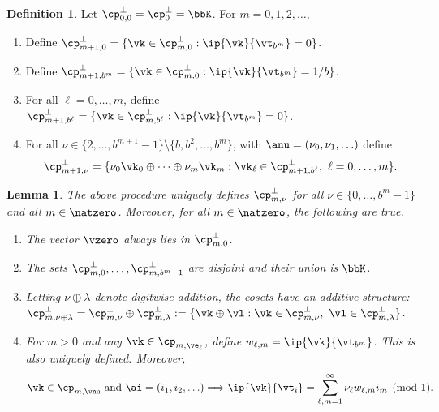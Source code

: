 \documentclass[]{elsarticle}
\newtheorem{lem}{Lemma}
\theoremstyle{definition}
\newtheorem{defin}{Definition}
\begin{document}
\begin{defin} \label{noodefalgo} Let $\cp_{0,0}^{\perp}=\cp_{0}^{\perp}=\bbK$.  For $m=0, 1, 2, \ldots$, 
\begin{enumerate}
\renewcommand{\labelenumi}{\alph{enumi})}
\item Define $\cp_{m+1,0}^{\perp}=\{\vk \in \cp_{m,0}^{\perp} : \ip{\vk}{\vt_{b^{m}}}=0\}$.
\item Define $\cp_{m+1,b^{m}}^{\perp}=\{\vk \in \cp_{m,0}^{\perp} : \ip{\vk}{\vt_{b^{m}}}=1/b\}$.  
\item For all $\ell=0, \ldots, m$, define $\cp_{m+1,b^{\ell}}^{\perp}=\{\vk \in \cp_{m,b^{\ell}}^{\perp} : \ip{\vk}{\vt_{b^{m}}}=0\}$.
\item For all $\nu \in \{2, \ldots, b^{m+1}-1\} \setminus \{b, b^2, \ldots, b^m\}$, with $\anu=(\nu_0, \nu_1, \ldots)$ define 
\[
\cp_{m+1,\nu}^{\perp}= \{\nu_0\vk_0 \oplus \cdots \oplus \nu_{m} \vk_{m}  : \vk_\ell \in \cp_{m+1,b^{\ell}}^{\perp},\  \ell=0, \ldots, m\}.
\]
\end{enumerate}
\end{defin}

\begin{lem} \label{cosetlem} The above procedure uniquely defines $\cp_{m,\nu}^{\perp}$  for all $\nu \in \{0, \ldots, b^m-1\}$ and all $m \in \natzero$.  Moreover, for all $m \in \natzero$, the following are true.
\begin{enumerate}
\renewcommand{\labelenumi}{\alph{enumi})}

\item The vector $\vzero$ always lies in $\cp_{m,0}^{\perp}$.

\item The sets $\cp_{m,0}^{\perp}, \ldots, \cp_{m,b^m-1}^{\perp}$ are disjoint and their union is $\bbK$.

\item Letting $\nu \oplus \lambda$ denote digitwise addition, the cosets have an additive structure: $\cp_{m,\nu \oplus \lambda}^{\perp} = \cp_{m,\nu}^{\perp} \oplus \cp_{m,\lambda}^{\perp} := \{\vk \oplus \vl :  \vk \in \cp_{m,\nu}^{\perp},\ \vl \in \cp_{m,\lambda}^{\perp}\}$.

\item For $m>0$ and any $\vk \in \cp_{m,\ve_\ell}$, define $w_{\ell,m}=\ip{\vk}{\vt_{b^m}}$.  This is also uniquely defined.  Moreover,
\begin{equation} \label{nuwisum}
\vk\in \cp_{m,\vnu} \text{ and } \ai=(i_1, i_2, \ldots) \Longrightarrow \ip{\vk}{\vt_i} = \sum_{\ell,m=1}^{\infty} \nu_\ell w_{\ell,m} i_m \pmod 1.
\end{equation}

\end{enumerate}
\end{lem}
\end{document}
